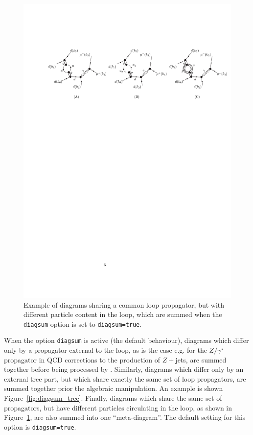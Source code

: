 \begin{figure}[htb]
\centering
\includegraphics[width=1.0\textwidth]{figures/diagsum2.pdf}
\caption{Example of diagrams sharing a common loop propagator, 
but with different particle content in the loop, which are summed when
the \texttt{diagsum} option is set to \texttt{diagsum=true}.}
\label{fig:diagsum_particle}
\end{figure} 


When the option \texttt{diagsum} is active (the default behaviour), diagrams which differ only by
a propagator external to the loop, as is the case e.g. for the
$Z/\gamma^\star$ propagator in QCD corrections to the production of
$Z+$jets, are summed together before being processed
by \form{}. Similarly, diagrams which differ only by an external tree
part, but which share exactly the same set of loop propagators, are
summed together prior the algebraic manipulation. An example is shown
Figure~\ref{fig:diagsum_tree}. Finally, diagrams which share the same
set of propagators, but have different particles circulating in the
loop, as shown in Figure~\ref{fig:diagsum_particle}, are also summed
into one ``meta-diagram''. The default setting for this option is \texttt{diagsum=true}.


